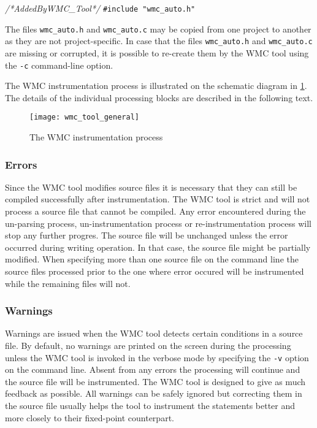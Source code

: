 {
{\em /*AddedByWMC\_Tool*/}    {\verb|#include "wmc_auto.h"|}
}

The files \verb|wmc_auto.h| and \verb|wmc_auto.c| may be copied from one project to another as they are not project-specific. In case that the files \verb|wmc_auto.h| and \verb|wmc_auto.c| are missing or corrupted, it is possible to re-create them by the WMC tool using the \verb|-c| command-line option.

The WMC instrumentation process is illustrated on the schematic diagram in \ref{fig:wmc_tool_general}. The details of the individual processing blocks are described in the following text.

\begin{figure}[!hbtp]
\begin{center}
\texttt{[image: wmc\_tool\_general]}
\end{center}
\caption{The WMC instrumentation process}
\label{fig:wmc_tool_general}
\end{figure}

\subsubsection{Errors}

Since the WMC tool modifies source files it is necessary that they can still be compiled successfully after instrumentation. The WMC tool is strict and will not process a source file that cannot be compiled. Any error encountered during the un-parsing process, un-instrumentation process or re-instrumentation process will stop any further progres. The source file will be unchanged unless the error occurred during writing operation. In that case, the source file might be partially modified. When specifying more than one source file on the command line the source files processed prior to the one where error occured will be instrumented while the remaining files will not.
	
\subsubsection{Warnings}

Warnings are issued when the WMC tool detects certain conditions in a source file. By default, no warnings are printed on the screen during the processing unless the WMC tool is invoked in the verbose mode by specifying the \verb|-v| option on the command line. Absent from any errors the processing will continue and the source file will be instrumented. The WMC tool is designed to give as much feedback as possible. All warnings can be safely ignored but correcting them in the source file usually helps the tool to instrument the statements better and more closely to their fixed-point counterpart. 

